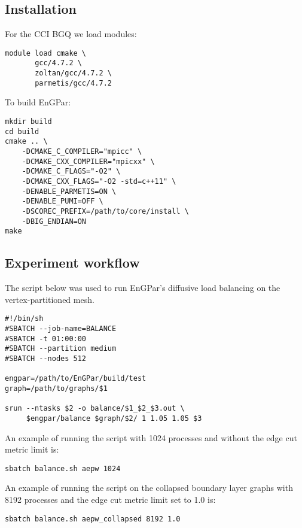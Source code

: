 \subsection{Installation}

For the CCI BGQ we load modules:
{\scriptsize
\begin{lstlisting}
module load cmake \
       gcc/4.7.2 \
       zoltan/gcc/4.7.2 \
       parmetis/gcc/4.7.2
\end{lstlisting}
}

To build EnGPar:
{\scriptsize
\begin{lstlisting}
mkdir build
cd build
cmake .. \
    -DCMAKE_C_COMPILER="mpicc" \
    -DCMAKE_CXX_COMPILER="mpicxx" \
    -DCMAKE_C_FLAGS="-O2" \
    -DCMAKE_CXX_FLAGS="-O2 -std=c++11" \
    -DENABLE_PARMETIS=ON \
    -DENABLE_PUMI=OFF \
    -DSCOREC_PREFIX=/path/to/core/install \
    -DBIG_ENDIAN=ON
make
\end{lstlisting}
}

\subsection{Experiment workflow}

The script below was used to run EnGPar's diffusive load balancing on the vertex-partitioned mesh.
{\scriptsize
\begin{lstlisting}
#!/bin/sh
#SBATCH --job-name=BALANCE
#SBATCH -t 01:00:00
#SBATCH --partition medium
#SBATCH --nodes 512

engpar=/path/to/EnGPar/build/test
graph=/path/to/graphs/$1

srun --ntasks $2 -o balance/$1_$2_$3.out \
     $engpar/balance $graph/$2/ 1 1.05 1.05 $3
\end{lstlisting}
}

An example of running the script with 1024 processes and without the edge cut metric limit is:

{\scriptsize
\begin{lstlisting}
sbatch balance.sh aepw 1024
\end{lstlisting}
}

An example of running the script on the collapsed boundary layer graphs with 8192 processes and the edge cut metric limit set to 1.0 is:

{\scriptsize
\begin{lstlisting}
sbatch balance.sh aepw_collapsed 8192 1.0
\end{lstlisting}
}

